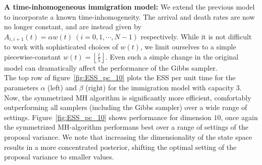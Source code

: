 \textbf{A time-inhomogeneous immigration model:}
We extend the previous model to incorporate a known time-inhomogeneity. 
The arrival and death rates are now no longer constant, and are instead given by
$A_{i, i+1}(t) = \alpha w(t) \ (i =0,1,\cdots,N-1)$ respectively.
While it is not difficult to work with sophisticated choices of $w(t)$, we limit ourselves to a simple piecewise-constant $w(t) = \left\lfloor \frac{t}{5} \right\rfloor$. 
Even such a simple change in the original model can dramatically affect the performance
of the Gibbs sampler. \\
 The top row of figure~\ref{fig:ESS_pc_10} plots the ESS per unit time for the parameters $\alpha$ (left) and $\beta$ (right) for the immigration model with capacity $3$.  
 Now, the symmetrized MH algorithm is significantly more efficient, comfortably outperforming all samplers (including the Gibbs 
 sampler) over a wide range of settings. %
 Figure~\ref{fig:ESS_pc_10} shows performance for dimension $10$, once again the symmetrized MH-algorithm performans best over a range of settings of the proposal variance. We note that increasing the
 dimensionality of the state space results in a more concentrated posterior, shifting the optimal setting of the proposal variance to smaller values.

